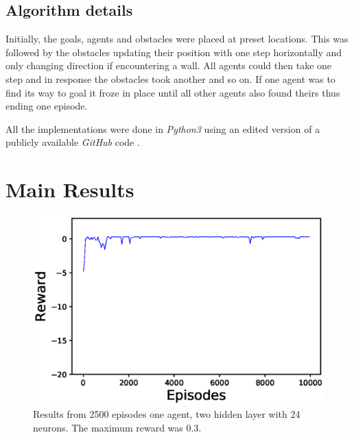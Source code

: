 \documentclass[journal,twoside]{IEEEtran}
\begin{document}
\subsection{Algorithm details}

Initially, the goals, agents and obstacles were placed at preset locations. This was followed by the obstacles updating their position with one step horizontally and only changing direction if encountering a wall. All agents could then take one step and in response the obstacles took another and so on. If one agent was to find its way to goal it froze in place until all other agents also found theirs thus ending one episode. 

All the implementations were done in \textit{Python3} using an edited version of a publicly available \textit{GitHub} code \cite{code}.

\newpage

\section{Main Results}


\begin{figure}[!h]
	\centering
	\includegraphics[width=\columnwidth]{1Agent_24n__2l_180000steps_110s}
	\caption{Results from 2500 episodes one agent, two hidden layer with 24 neurons. The maximum reward was 0.3.}
	\label{1agent24n}
\end{figure}
\end{document}
